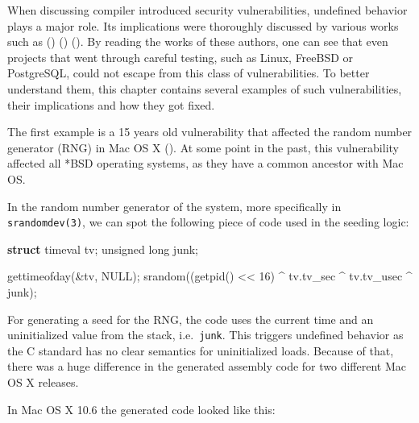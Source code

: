 \documentclass[
  a4paper,
]{report}
\newenvironment{Shaded}{}{}
\newcommand{\DataTypeTok}[1]{\textcolor[rgb]{0.56,0.13,0.00}{#1}}
\newcommand{\DecValTok}[1]{\textcolor[rgb]{0.25,0.63,0.44}{#1}}
\newcommand{\KeywordTok}[1]{\textcolor[rgb]{0.00,0.44,0.13}{\textbf{#1}}}
\newcommand{\NormalTok}[1]{#1}
\newcommand{\OperatorTok}[1]{\textcolor[rgb]{0.40,0.40,0.40}{#1}}
\begin{document}
When discussing compiler introduced security vulnerabilities, undefined
behavior plays a major role. Its implications were thoroughly discussed
by various works such as () ()
(). By reading the works
of these authors, one can see that even projects that went through
careful testing, such as Linux, FreeBSD or PostgreSQL, could not escape
from this class of vulnerabilities. To better understand them, this
chapter contains several examples of such vulnerabilities, their
implications and how they got fixed.

The first example is a 15 years old vulnerability that affected the
random number generator (RNG) in Mac OS X (). At some point in the past, this vulnerability affected all *BSD
operating systems, as they have a common ancestor with Mac OS.

In the random number generator of the system, more specifically in
\texttt{srandomdev(3)}, we can spot the following piece of code used in
the seeding logic:

\begin{Shaded}
\begin{Highlighting}[]
\KeywordTok{struct}\NormalTok{ timeval tv}\OperatorTok{;}
\DataTypeTok{unsigned} \DataTypeTok{long}\NormalTok{ junk}\OperatorTok{;}

\NormalTok{gettimeofday}\OperatorTok{(\&}\NormalTok{tv}\OperatorTok{,}\NormalTok{ NULL}\OperatorTok{);}
\NormalTok{srandom}\OperatorTok{((}\NormalTok{getpid}\OperatorTok{()} \OperatorTok{\textless{}\textless{}} \DecValTok{16}\OperatorTok{)} \OperatorTok{\^{}}\NormalTok{ tv}\OperatorTok{.}\NormalTok{tv\_sec }\OperatorTok{\^{}}\NormalTok{ tv}\OperatorTok{.}\NormalTok{tv\_usec }\OperatorTok{\^{}}\NormalTok{ junk}\OperatorTok{);}
\end{Highlighting}
\end{Shaded}

For generating a seed for the RNG, the code uses the current time and an
uninitialized value from the stack, i.e.~\texttt{junk}. This triggers
undefined behavior as the C standard has no clear semantics for
uninitialized loads. Because of that, there was a huge difference in the
generated assembly code for two different Mac OS X releases.

In Mac OS X 10.6 the generated code looked like this:
\end{document}
